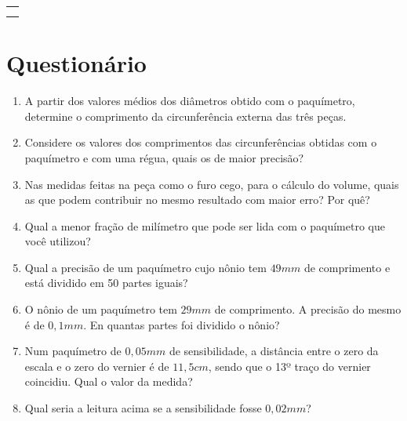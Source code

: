 \begin{table}[h]
\centering
\begin{tabular}{|p{10cm}|}
\hline 
\\
\\
\hline
\end{tabular}
\end{table}

\section{Questionário}
\begin{enumerate}
\item A partir dos valores médios dos diâmetros obtido com o paquímetro, determine o comprimento da circunferência externa das três peças.
\item Considere os valores dos comprimentos das circunferências obtidas com o paquímetro e com uma régua, quais os de maior precisão?
\item Nas medidas feitas na peça como o furo cego, para o cálculo do volume, quais as que podem contribuir no mesmo resultado com maior erro? Por quê?
\item Qual a menor fração de milímetro que pode ser lida com o paquímetro que você utilizou?
\item Qual a precisão de um paquímetro cujo nônio tem $49mm$ de comprimento e está dividido em 50 partes iguais?
\item O nônio de um paquímetro tem $29mm$ de comprimento. A precisão do mesmo é de $0,1mm$. En quantas partes foi dividido o nônio?
\item Num paquímetro de $0,05mm$ de sensibilidade, a distância  entre o zero da escala e o zero do vernier é de $11,5cm$, sendo que o 13º traço do vernier coincidiu. Qual o valor da medida?
\item Qual seria a leitura acima se a sensibilidade fosse $0,02mm$?
\end{enumerate}

